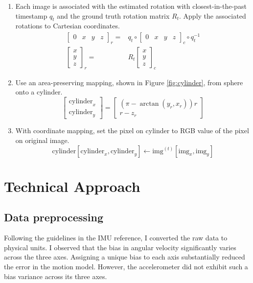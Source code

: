 \documentclass[conference]{IEEEtran}
\begin{document}
\begin{enumerate}
    \item Each image is associated with the estimated rotation with 
    closest-in-the-past timestamp $q_t$ and the ground truth rotation matrix $R_t$. 
    Apply the associated rotations to Cartesian coordinates.
    $$
    \begin{aligned}
        \left[ \begin{matrix}0&x&y&z\end{matrix} \right]_{r}  =&q_{t}\circ \left[ \begin{matrix}0&x&y&z\end{matrix} \right]_{c}  \circ q^{-1}_{t}\\ 
        \left[ \begin{matrix}x\\y\\z\end{matrix} \right]_{r}  =&R_{t}\left[ \begin{matrix}x\\ y\\ z\end{matrix} \right]_{c}  
    \end{aligned} 
    $$

    \item Use an area-preserving mapping, shown in Figure \ref*{fig:cylinder}, from sphere onto a cylinder.
    $$
    \left[ \begin{gathered}\text{cylinder}_{x} \\ \text{cylinder}_{y} \end{gathered} \right]  =\left[ \begin{matrix}\left( \pi -\arctan \left( y_{r},x_{r}\right)  \right)  r\\ r-z_{r}\end{matrix} \right]  
    $$

    \item With coordinate mapping, set the pixel on cylinder to RGB value of the pixel on original image.
    $$
    \text{cylinder}\left[\text{cylinder}_{x}, \text{cylinder}_{y}\right] \leftarrow 
    \text{img}^{(t)}\left[\text{img}_{x}, \text{img}_{y}\right]
    $$

\end{enumerate}


\section{Technical Approach}
\subsection{Data preprocessing}
Following the guidelines in the IMU reference, 
I converted the raw data to physical units. 
I observed that the bias in angular velocity significantly varies across the three axes. 
Assigning a unique bias to each axis substantially reduced the error in the motion model. 
However, the accelerometer did not exhibit such a bias variance across its three axes.
\end{document}

